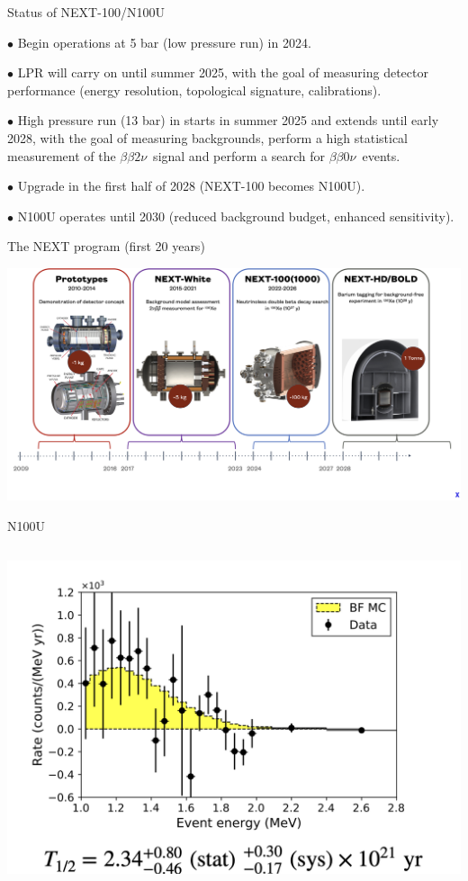 \documentclass [aspectratio=169]{beamer}
\newcommand{\bbonu}{\ensuremath{\beta\beta0\nu}}
\newcommand{\bbtnu}{\ensuremath{\beta\beta2\nu}}
\begin{document}

\begin{frame}{Status of NEXT-100/N100U}

$\bullet$ Begin operations at 5 bar (low pressure run) in 2024.

$\bullet$ LPR will carry on until summer 2025, with the goal of measuring detector performance (energy resolution, topological signature, calibrations).


$\bullet$ High pressure run (13 bar) in starts in summer 2025 and extends until early 2028, with the goal of measuring backgrounds, perform a high statistical measurement of the \bbtnu\ signal and perform a search for \bbonu\ events. 

$\bullet$ Upgrade in the first half of 2028 (NEXT-100 becomes N100U). 

$\bullet$ N100U operates until 2030 (reduced background budget, enhanced sensitivity).

\end{frame}

\begin{frame}{The NEXT program (first 20 years)}

\includegraphics[scale=0.23]{nextprogram.png}

\end{frame}

\begin{frame}{N100U}
\begin{columns}
\includegraphics[scale=0.36]{bb2nu.png}
\end{columns}
\end{frame}
\end{document}
